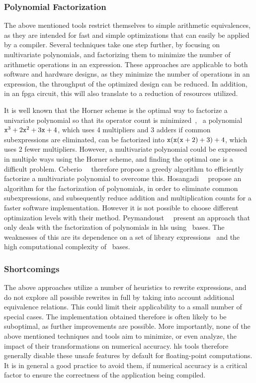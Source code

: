 \subsubsection{Polynomial Factorization}

The above mentioned tools restrict themselves to simple arithmetic
equivalences, as they are intended for fast and simple optimizations that can
easily be applied by a compiler.  Several techniques take one step further,
by focusing on multivariate polynomials, and factorizing them to minimize
the number of arithmetic operations in an expression.  These approaches are
applicable to both software and hardware designs, as they minimize the number
of operations in an expression, the throughput of the optimized design can be
reduced.  In addition, in an \gls{fpga} circuit, this will also translate to a
reduction of resources utilized.

It is well known that the Horner scheme is the optimal way to
factorize a univariate polynomial so that its operator count is
minimized~\cite{neumaier01}, \eg~a polynomial $\texttt{x}^3 + 2 \texttt{x}^2 + 3
\texttt{x} + 4$, which uses 4 multipliers and 3 adders if common subexpressions
are eliminated, can be factorized into $\texttt{x}(\texttt{x}(\texttt{x} + 2) + 3) + 4$,
which uses 2 fewer multipliers.  However, a multivariate polynomial could be
expressed in multiple ways using the Horner scheme, and finding the optimal
one is a difficult problem.  Ceberio~\etal~\cite{ceberio04} therefore propose
a greedy algorithm to efficiently factorize a multivariate polynomial to
overcome this.  Hosangadi~\etal~\cite{hosangadi} propose an algorithm for the
factorization of polynomials, in order to eliminate common subexpressions, and
subsequently reduce addition and multiplication counts for a faster software
implementation.  However it is not possible to choose different optimization
levels with their method.  Peymandoust~\etal~\cite{peymandoust} present an
approach that only deals with the factorization of polynomials in \gls{hls}
using \groebner~bases.  The weaknesses of this are its dependence on a set of
library expressions~\cite{hosangadi} and the high computational complexity of
\groebner~bases.

\subsubsection{Shortcomings}

The above approaches utilize a number of heuristics to rewrite expressions, and
do not explore all possible rewrites in full by taking into account additional
equivalence relations.  This could limit their applicability to a small number
of special cases.  The implementation obtained therefore is often likely to
be suboptimal, as further improvements are possible.  More importantly, none
of the above mentioned techniques and tools aim to minimize, or even analyze,
the impact of their transformations on numerical accuracy.  \Gls{hls} tools
therefore generally disable these unsafe features by default for floating-point
computations.  It is in general a good practice to avoid them, if numerical
accuracy is a critical factor to ensure the correctness of the application
being compiled.


